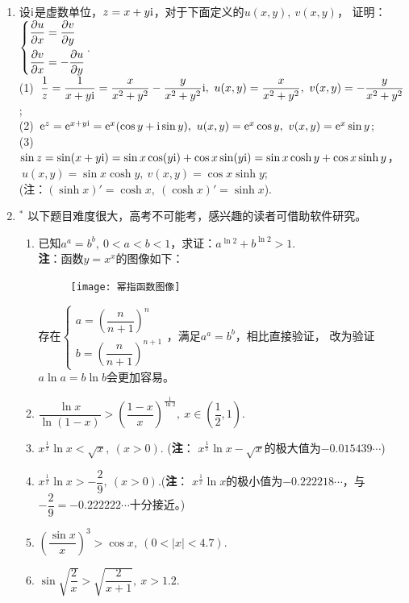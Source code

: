 \begin{enumerate}[label={\textbf{\arabic*.}},leftmargin=
    \inteval{\myenumleftmargin}pt]
\item 设$ \mathrm{i} $是虚数单位，$ z=x+ y\mathrm{i} $，对于下面定义的$ u(x,y),\ v(x,y) $，
证明：$ \begin{dcases}
    \dfrac{\partial u}{\partial x} =\dfrac{\partial v}{\partial y} \\
    \dfrac{\partial v}{\partial x} =-\dfrac{\partial u}{\partial y} 
\end{dcases} $. \\
(1)\ $ \dfrac{1}{z}=\dfrac{1}{x+y\mathrm{i}}=\dfrac{x}{x^2+y^2}-\dfrac{y}{x^2+y^2}\mathrm{i},
\ u(x,y)=\dfrac{x}{x^2+y^2},\ v(x,y)=-\dfrac{y}{x^2+y^2} $; \\
(2)\ $ \e^{z}=\e^{x+y\i}=\e^x(\cos y+\i\sin y),\ u(x,y)=\e^x \cos y,
\ v(x,y)=\e^x\sin y $; \\
(3)\ $ \sin z=\sin(x+y\mathrm{i})=\sin x\cos(y\mathrm{i})+\cos x\sin(y\mathrm{i})=\sin x\cosh y+
\cos x\sinh y $， \\ $\ u(x,y)=\sin x\cosh y,\ v(x,y)=\cos x\sinh y $; \\
(注：$ (\sinh x)'=\cosh x,\ (\cosh x)'=\sinh x $). 

\item $ ^* $ 以下题目难度很大，高考不可能考，感兴趣的读者可借助软件研究。
\begin{enumerate}[label={(\arabic*)},itemsep=-1pt]
\item 已知$ a^a=b^b,\ 0<a<b<1 $，求证：$ a^{\ln 2}+b^{\ln2}>1 $. \\
\textbf{注}：函数$ y=x^x $的图像如下：
\begin{figure}[!htbp]
    \centering
    \texttt{[image: 幂指函数图像]}
\end{figure} 
 
存在$\begin{cases}
    a=\left(\dfrac{n}{n+1}\right)^n \\
    b=\left(\dfrac{n}{n+1}\right)^{n+1}
\end{cases}$，满足$a^a=b^b$，相比直接验证，
改为验证$a\ln a=b\ln b$会更加容易。 

\item $ \dfrac{\ln x}{\ln(1-x)}>\left(\dfrac{1-x}{x}\right)^{
    \frac{1}{\ln 2}},\ x\in\left(\dfrac{1}{2},1\right) $. 
\item $ x^{\frac{1}{x}}\ln x<\sqrt{x},\ (x>0) $. (\textbf{注}：
$ x^{\frac{1}{x}}\ln x-\sqrt{x} $的极大值为$ -0.015439\cdots $) 
\item $ x^{\frac{1}{x}}\ln x >-\dfrac{2}{9},\ (x>0) $.(\textbf{注}：
$ x^{\frac{1}{x}}\ln x $的极小值为$ -0.222218\cdots $，与
$ -\dfrac{2}{9}=-0.222222\cdots $十分接近。) 
\item $ \left(\dfrac{\sin x}{x}\right)^3>\cos x,\ (0<|x|<4.7) $.
\item $ \sin\sqrt{\dfrac{2}{x}}>\sqrt{\dfrac{2}{x+1}},\ x>1.2 $.
\end{enumerate}


\end{enumerate}
